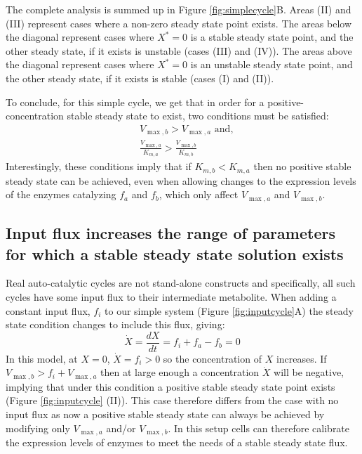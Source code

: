 \documentclass[a4page,notitlepage]{article}
\begin{document}
    The complete analysis is summed up in Figure \ref{fig:simplecycle}B.
    Areas (II) and (III) represent cases where a non-zero steady state point exists.
    The areas below the diagonal represent cases where $X^*=0$ is a stable steady state point, and the other steady state, if it exists is unstable (cases (III) and (IV)).
    The areas above the diagonal represent cases where $X^*=0$ is an unstable steady state point, and the other steady state, if it exists is stable (cases (I) and (II)).
    

    To conclude, for this simple cycle, we get that in order for a positive-concentration stable steady state to exist, two conditions must be satisfied:
    $$
    \begin{aligned}
      & V_{\max,b}>V_{\max,a} \text{ and,}\\
      & \frac{V_{\max,a}}{K_{m,a}}>\frac{V_{\max,b}}{K_{m,b}}
    \end{aligned}
    $$
    Interestingly, these conditions imply that if $K_{m,b}<K_{m,a}$ then no positive stable steady state can be achieved, even when allowing changes to the expression levels of the enzymes catalyzing $f_a$ and $f_b$, which only affect $V_{\max,a}$ and $V_{\max,b}$.
    
\subsection{Input flux increases the range of parameters for which a stable steady state solution exists}
    Real auto-catalytic cycles are not stand-alone constructs and specifically, all such cycles have some input flux to their intermediate metabolite.
    When adding a constant input flux, $f_i$ to our simple system (Figure \ref{fig:inputcycle}A) the steady state condition changes to include this flux, giving:
    \begin{equation*}
      \dot X = \frac{dX}{dt} = f_i + f_a - f_b = 0
    \end{equation*}
    In this model, at $X=0$, $\dot X=f_i>0$ so the concentration of $X$ increases. 
    If $V_{\max,b}>f_i+V_{\max,a}$ then at large enough a concentration $\dot X$ will be negative, implying that under this condition a positive stable steady state point exists (Figure \ref{fig:inputcycle} (II)).
    This case therefore differs from the case with no input flux as now a positive stable steady state can always be achieved by modifying only $V_{\max,a}$ and/or $V_{\max,b}$.
    In this setup cells can therefore calibrate the expression levels of enzymes to meet the needs of a stable steady state flux.
\end{document}
